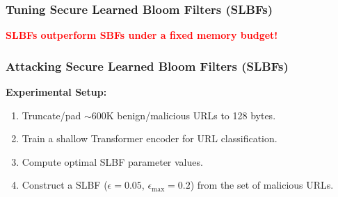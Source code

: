 \documentclass{beamer}
\begin{document}

\begin{frame}
\frametitle{Tuning Secure Learned Bloom Filters (SLBFs)}

\begin{center}

    \textcolor{red}{\textbf{SLBFs outperform SBFs under a fixed memory budget!}}
\end{center}

\end{frame}


\begin{frame}
\frametitle{Attacking Secure Learned Bloom Filters (SLBFs)}

\textbf{Experimental Setup:}
\begin{enumerate}
    \item Truncate/pad $\sim600$K benign/malicious URLs to 128 bytes.
    \item Train a shallow Transformer encoder for URL classification.
    \item Compute optimal SLBF parameter values.
    \item Construct a SLBF ($\epsilon=0.05$, $\epsilon_\text{max} = 0.2$) from the set of malicious URLs.
\end{enumerate}

\end{frame}

\end{document}
